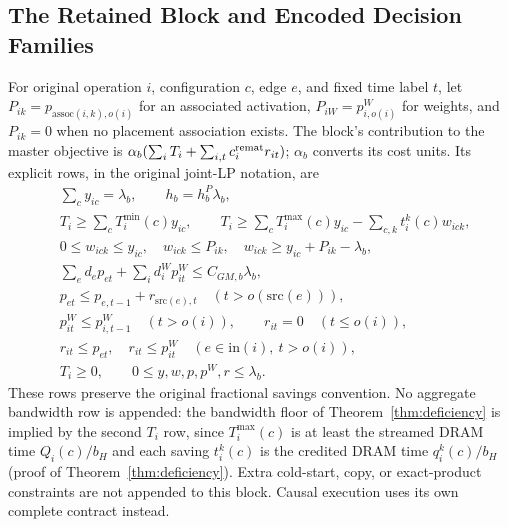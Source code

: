 \subsection{The Retained Block and Encoded Decision Families}\label{app:rows_retained}
For original operation $i$, configuration $c$, edge $e$, and fixed time label $t$, let $P_{ik}=p_{\mathrm{assoc}(i,k),o(i)}$ for an associated activation, $P_{iW}=p^W_{i,o(i)}$ for weights, and $P_{ik}=0$ when no placement association exists.
The block's contribution to the master objective is $\alpha_b(\sum_i T_i+\sum_{i,t}c_i^{\rm remat}r_{it})$; $\alpha_b$ converts its cost units.
Its explicit rows, in the original joint-LP notation, are
\begin{align*}
&\sum_c y_{ic}=\lambda_b,\qquad h_b=h_b^P\lambda_b,\\
&T_i\ge\sum_cT_i^{\min}(c)y_{ic},\qquad
 T_i\ge\sum_cT_i^{\max}(c)y_{ic}-\sum_{c,k}t_i^k(c)w_{ick},\\
&0\le w_{ick}\le y_{ic},\quad w_{ick}\le P_{ik},\quad
 w_{ick}\ge y_{ic}+P_{ik}-\lambda_b,\\
&\sum_e d_ep_{et}+\sum_i d_i^Wp^W_{it}\le C_{GM,b}\lambda_b,\\
&p_{et}\le p_{e,t-1}+r_{\mathrm{src}(e),t}\quad(t>o(\mathrm{src}(e))),\\
&p^W_{it}\le p^W_{i,t-1}\quad(t>o(i)),\qquad r_{it}=0\quad(t\le o(i)),\\
&r_{it}\le p_{et},\quad r_{it}\le p^W_{it}\quad(e\in\mathrm{in}(i),\ t>o(i)),\\
&T_i\ge0,\qquad 0\le y,w,p,p^W,r\le\lambda_b.
\end{align*}
These rows preserve the original fractional savings convention.
No aggregate bandwidth row is appended: the bandwidth floor of Theorem~\ref{thm:deficiency} is implied by the second $T_i$ row, since $T^{\max}_i(c)$ is at least the streamed DRAM time $Q_i(c)/b_H$ and each saving $t^k_i(c)$ is the credited DRAM time $q^k_i(c)/b_H$ (proof of Theorem~\ref{thm:deficiency}).
Extra cold-start, copy, or exact-product constraints are not appended to this block.
Causal execution uses its own complete contract instead.

